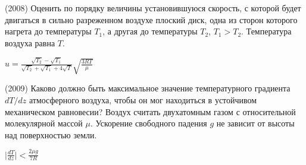 \begin{ex}
(2008) Оценить по порядку величины установившуюся скорость, с которой будет двигаться в сильно разреженном воздухе плоский диск, одна из сторон которого нагрета до температуры $T_1$, а другая до температуры $T_2$, $T_1>T_2$. Температура воздуха равна $T$.
\begin{ans}
$u = \frac{\sqrt{T_2}-\sqrt{T_1}}{\sqrt{T_2}+\sqrt{T_1}+4\sqrt{T}} \sqrt{\frac{3RT}{\mu}}$
\end{ans}
\end{ex}

\begin{ex}
(2009) Каково должно быть максимальное значение температурного градиента $dT/dz$ атмосферного воздуха, 
чтобы он мог находиться в устойчивом механическом равновесии? Воздух считать двухатомным газом с относительной молекулярной массой $\mu$. 
Ускорение свободного падения $g$ не зависит от высоты над поверхностью земли.
\begin{ans}
$\mid \frac{dT}{dz} \mid < \frac{2\mu g}{7R}$
\end{ans}
\end{ex}